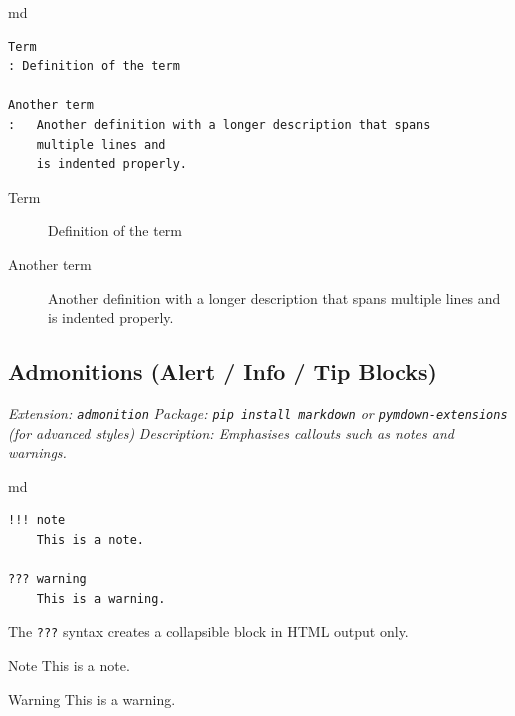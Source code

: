 \documentclass[a4paper,twoside]{article}
\begin{document}
\begin{code}{md}{}{}
\begin{Verbatim}[commandchars=\\\{\},breaklines, breakanywhere, commandchars=\\\{\}]
Term
: Definition of the term

Another term
:   Another definition with a longer description that spans
    multiple lines and
    is indented properly.
\end{Verbatim}
\end{code}
\begin{displayquote}

\begin{description}
\item[{ Term }] Definition of the term
\item[{ Another term }] Another definition with a longer description that spans
multiple lines and
is indented properly.

\end{description}

\end{displayquote}
\subsection{Admonitions (Alert / Info / Tip Blocks)}\label{admonitions-alert-info-tip-blocks}

\emph{Extension: \texttt{admonition}}
\emph{Package: \texttt{pip install markdown} or \texttt{pymdown-\allowbreak{}extensions} (for advanced styles)}
\emph{Description: Emphasises callouts such as notes and warnings.}

\begin{code}{md}{}{}
\begin{Verbatim}[commandchars=\\\{\},breaklines, breakanywhere, commandchars=\\\{\}]
!!! note
    This is a note.

??? warning
    This is a warning.
\end{Verbatim}
\end{code}
The \texttt{???} syntax creates a collapsible block in \acrshort{HTML} output only.

\begin{callout}{Note}
This is a note.
\end{callout}
\begin{callout}{Warning}
This is a warning.
\end{callout}
\end{document}
